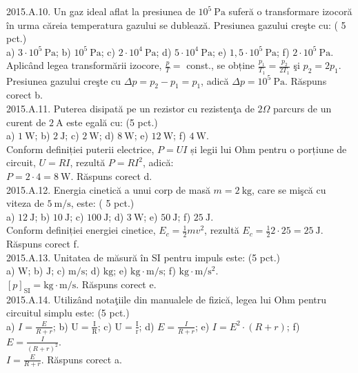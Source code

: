 2015.A.10. Un gaz ideal aflat la presiunea de $10^{5} \mathrm{~Pa}$ suferă o transformare izocoră în urma căreia temperatura gazului se dublează. Presiunea gazului creşte cu: ( 5 pct.)\\ a) $3 \cdot 10^{5} \mathrm{~Pa}$; b) $10^{5} \mathrm{~Pa}$; c) $2 \cdot 10^{4} \mathrm{~Pa}$; d) $5 \cdot 10^{4} \mathrm{~Pa}$; e) $1,5 \cdot 10^{5} \mathrm{~Pa}$; f) $2 \cdot 10^{5} \mathrm{~Pa}$.\\ Aplicând legea transformării izocore, $\frac{p}{T}=$ const., se obține $\frac{p_{1}}{T_{1}}=\frac{p_{2}}{2 T_{1}}$ şi $p_{2}=2 p_{1}$. Presiunea gazului creşte cu $\Delta p=p_{2}-p_{1}=p_{1}$, adică $\Delta p=10^{5} \mathrm{~Pa}$. Răspuns corect b.\\

2015.A.11. Puterea disipată pe un rezistor cu rezistenţa de $2 \Omega$ parcurs de un curent de $2 \mathrm{~A}$ este egală cu: (5 pct.)\\ a) $1 \mathrm{~W}$; b) $2 \mathrm{~J}$; c) $2 \mathrm{~W}$; d) $8 \mathrm{~W}$; e) $12 \mathrm{~W}$; f) $4 \mathrm{~W}$.\\ Conform definiției puterii electrice, $P=U I$ și legii lui Ohm pentru o porțiune de circuit, $U=R I$, rezultă $P=R I^{2}$, adică:\\ $P=2 \cdot 4=8 \mathrm{~W}$. Răspuns corect d.\\

2015.A.12. Energia cinetică a unui corp de masă $m=2 \mathrm{~kg}$, care se mişcă cu viteza de $5 \mathrm{~m} / \mathrm{s}$, este: ( 5 pct.)\\ a) $12 \mathrm{~J}$; b) $10 \mathrm{~J}$; c) $100 \mathrm{~J}$; d) $3 \mathrm{~W}$; e) $50 \mathrm{~J}$; f) $25 \mathrm{~J}$.\\ Conform definiției energiei cinetice, $E_{c}=\frac{1}{2} m v^{2}$, rezultă $E_{c}=\frac{1}{2} 2 \cdot 25=25 \mathrm{~J}$. Răspuns corect f.\\

2015.A.13. Unitatea de măsură în SI pentru impuls este: (5 pct.)\\ a) $\mathrm{W}$; b) $\mathrm{J}$; c) $\mathrm{m} / \mathrm{s}$; d) $\mathrm{kg}$; e) $\mathrm{kg} \cdot \mathrm{m} / \mathrm{s}$; f) $\mathrm{kg} \cdot \mathrm{m} / \mathrm{s}^{2}$.\\ $[p]_{\mathrm{SI}}=\mathrm{kg} \cdot \mathrm{m} / \mathrm{s}$. Răspuns corect e.\\

2015.A.14. Utilizând notaţiile din manualele de fizică, legea lui Ohm pentru circuitul simplu este: (5 pct.)\\ a) $I=\frac{E}{R+r}$; b) $\mathrm{U}=\frac{\mathrm{I}}{\mathrm{R}}$; c) $\mathrm{U}=\frac{\mathrm{I}}{\mathrm{r}}$; d) $E=\frac{I}{R+r}$; e) $I=E^{2} \cdot(R+r)$; f) $E=\frac{I}{(R+r)^{2}}$.\\ $I=\frac{E}{R+r}$. Răspuns corect a.\\

